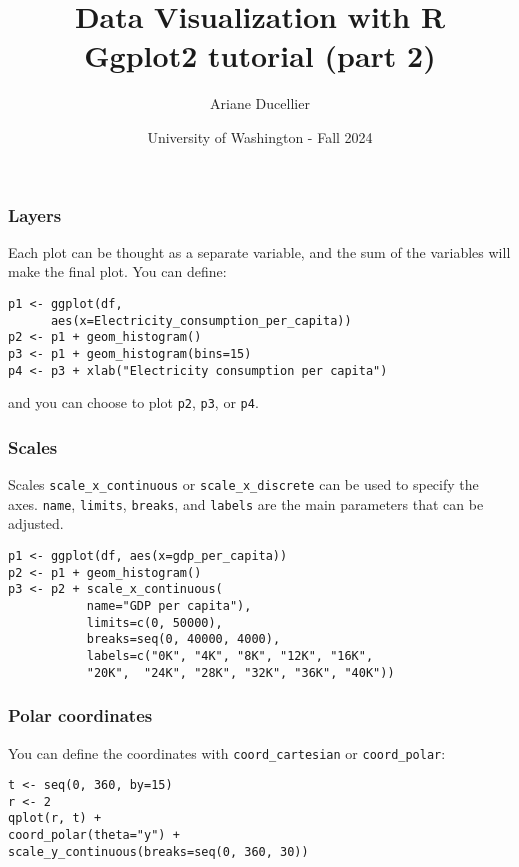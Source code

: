 \documentclass{beamer}
\title[Data Visualization with R - Ggplot2 tutorial (part 2)]{Data Visualization with R \\ Ggplot2 tutorial (part 2)}
\author{Ariane Ducellier}
\date{University of Washington - Fall 2024}
\begin{document}
	\begin{frame}
		\titlepage
	\end{frame}

	\begin{frame}[fragile]
		\frametitle{Layers}

		Each plot can be thought as a separate variable, and the sum of the variables will make the final plot. You can define:

		\vspace{2em}

		\begin{exampleblock}{}
		\begin{BVerbatim}
p1 <- ggplot(df,
      aes(x=Electricity_consumption_per_capita))
p2 <- p1 + geom_histogram()
p3 <- p1 + geom_histogram(bins=15)
p4 <- p3 + xlab("Electricity consumption per capita")
		\end{BVerbatim}
		\end{exampleblock}{}

		\vspace{2em}

		and you can choose to plot \verb|p2|, \verb|p3|, or \verb|p4|.

	\end{frame}

	\begin{frame}[fragile]
		\frametitle{Scales}

		Scales \verb|scale_x_continuous| or \verb|scale_x_discrete| can be used to specify the axes. \verb|name|, \verb|limits|, \verb|breaks|, and \verb|labels| are the main parameters that can be adjusted.

		\vspace{2em}

		\begin{exampleblock}{}
		\begin{BVerbatim}
p1 <- ggplot(df, aes(x=gdp_per_capita))
p2 <- p1 + geom_histogram()
p3 <- p2 + scale_x_continuous(
           name="GDP per capita"),
           limits=c(0, 50000),
           breaks=seq(0, 40000, 4000),
           labels=c("0K", "4K", "8K", "12K", "16K",
           "20K",  "24K", "28K", "32K", "36K", "40K"))
		\end{BVerbatim}
		\end{exampleblock}{}

	\end{frame}

	\begin{frame}[fragile]
		\frametitle{Polar coordinates}

		You can define the coordinates with \verb|coord_cartesian| or \verb|coord_polar|:

		\vspace{2em}

		\begin{exampleblock}{}
		\begin{BVerbatim}
t <- seq(0, 360, by=15)
r <- 2
qplot(r, t) +
coord_polar(theta="y") +
scale_y_continuous(breaks=seq(0, 360, 30))
		\end{BVerbatim}
		\end{exampleblock}{}

	\end{frame}
\end{document}
